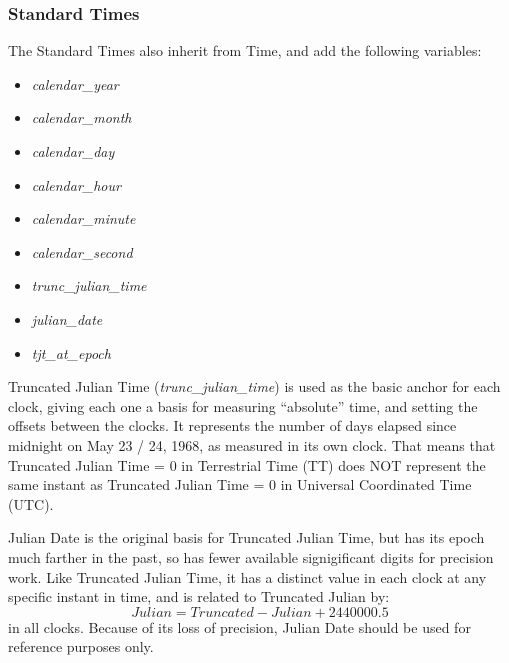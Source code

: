 \subsubsection[Standard Times]{Standard Times}
The Standard Times also inherit from Time, and add the following
variables:


\begin{itemize}
\item {\itshape
calendar\_year}
\item {\itshape
calendar\_month}
\item {\itshape
calendar\_day}
\item {\itshape
calendar\_hour}
\item {\itshape
calendar\_minute}
\item {\itshape
calendar\_second}
\item {\itshape
trunc\_julian\_time}
\item {\itshape
julian\_date}
\item {\itshape
tjt\_at\_epoch}
\end{itemize}



Truncated Julian Time (\textit{trunc\_julian\_time}) is used as the basic anchor
for each clock, giving each one a basis for measuring ``absolute'' time, and
setting the offsets between the clocks.  It
represents the number of days elapsed since
midnight on May 23 / 24, 1968, as measured in its own clock.
That means that Truncated
Julian Time = 0 in Terrestrial Time (TT) does NOT represent the same
instant as Truncated Julian Time = 0 in Universal Coordinated Time
(UTC).

Julian Date is the original basis for Truncated Julian Time, but has its epoch
much farther in the past, so has fewer available signigificant digits for
precision work.  Like
Truncated Julian Time, it has a distinct value in each clock at any specific
instant in time, and is related to Truncated Julian by:
\begin{equation*}
Julian = Truncated-Julian + 2440000.5
\end{equation*}
in all clocks.
Because of its loss of precision, Julian Date should be used for reference
purposes only.


